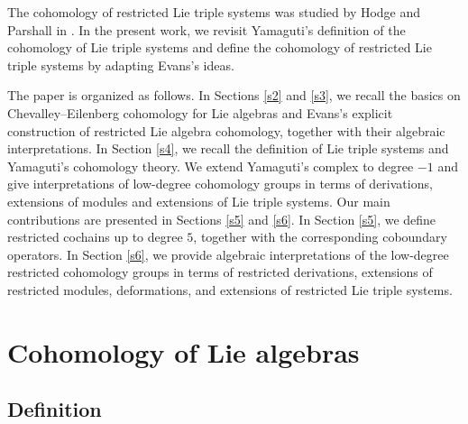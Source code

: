 \documentclass[11pt, twoside]{article}
\begin{document}
The cohomology of restricted Lie triple systems was studied by Hodge and Parshall in \cite{HP02}. In the present work, we revisit Yamaguti’s definition of the cohomology of Lie triple systems and define the cohomology of restricted Lie triple systems by adapting Evans’s ideas.

The paper is organized as follows. In Sections \eqref{s2} and \eqref{s3}, we recall the basics on Chevalley–Eilenberg cohomology for Lie algebras and Evans’s explicit construction of restricted Lie algebra cohomology, together with their algebraic interpretations. In Section \eqref{s4}, we recall the definition of Lie triple systems and Yamaguti’s cohomology theory. We extend Yamaguti’s complex to degree $-1$ and give interpretations of low-degree cohomology groups in terms of derivations, extensions of modules and extensions of Lie triple systems. Our main contributions are presented in Sections \eqref{s5} and \eqref{s6}. In Section \eqref{s5}, we define restricted cochains up to degree $5$, together with the corresponding coboundary operators. In Section \eqref{s6}, we provide algebraic interpretations of the low-degree restricted cohomology groups in terms of restricted derivations, extensions of restricted modules, deformations, and extensions of restricted Lie triple systems. 

\section{Cohomology of Lie algebras}\label{s2}

\subsection{Definition}
\end{document}
